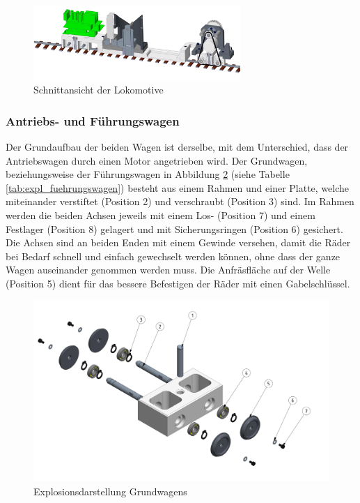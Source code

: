 \documentclass[../../main.tex]{subfiles}
\begin{document}
    \begin{figure}[H] %
        \centering
        \includegraphics[width=0.7\textwidth]{lokomotive_2.png}
        \caption{Schnittansicht der Lokomotive}
        \label{fig:schnitt_lokomotive}
    \end{figure}
    \newpage

    \subsubsection{Antriebs- und Führungswagen}
    Der Grundaufbau der beiden Wagen ist derselbe, mit dem Unterschied, dass der Antriebswagen durch einen Motor angetrieben wird. Der Grundwagen, beziehungsweise der Führungswagen in Abbildung \ref{fig:expl_fuehrungswagen} (siehe Tabelle \ref{tab:expl_fuehrungswagen}) besteht aus einem Rahmen und einer Platte, welche miteinander verstiftet (Position 2) und verschraubt (Position 3) sind. Im Rahmen werden die beiden Achsen jeweils mit einem Los- (Position 7) und einem Festlager (Position 8) gelagert und mit Sicherungsringen (Position 6) gesichert. Die Achsen sind an beiden Enden mit einem Gewinde versehen, damit die Räder bei Bedarf schnell und einfach gewechselt werden können, ohne dass der ganze Wagen auseinander genommen werden muss. Die Anfräsfläche auf der Welle (Position 5) dient für das bessere Befestigen der Räder mit einen Gabelschlüssel.\\

     \begin{figure}[H] %
        \centering
        \includegraphics[width=1\textwidth]{Fuehrungswagen.png}
        \caption{Explosionsdarstellung Grundwagens}
        \label{fig:expl_fuehrungswagen}
    \end{figure}
\end{document}
